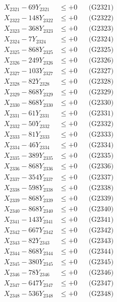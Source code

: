 \documentclass[a4paper,10pt]{article}
\begin{document}
{\begin{align}
\allowbreak
X_{2321} - 69Y_{2321} &\leq +0 && \text{(G2321)} \\
X_{2322} - 148Y_{2322} &\leq +0 && \text{(G2322)} \\
X_{2323} - 368Y_{2323} &\leq +0 && \text{(G2323)} \\
X_{2324} - 7Y_{2324} &\leq +0 && \text{(G2324)} \\
X_{2325} - 868Y_{2325} &\leq +0 && \text{(G2325)} \\
X_{2326} - 249Y_{2326} &\leq +0 && \text{(G2326)} \\
X_{2327} - 103Y_{2327} &\leq +0 && \text{(G2327)} \\
X_{2328} - 82Y_{2328} &\leq +0 && \text{(G2328)} \\
X_{2329} - 868Y_{2329} &\leq +0 && \text{(G2329)} \\
X_{2330} - 868Y_{2330} &\leq +0 && \text{(G2330)} \\
\allowbreak
X_{2331} - 61Y_{2331} &\leq +0 && \text{(G2331)} \\
X_{2332} - 50Y_{2332} &\leq +0 && \text{(G2332)} \\
X_{2333} - 81Y_{2333} &\leq +0 && \text{(G2333)} \\
X_{2334} - 46Y_{2334} &\leq +0 && \text{(G2334)} \\
X_{2335} - 389Y_{2335} &\leq +0 && \text{(G2335)} \\
X_{2336} - 868Y_{2336} &\leq +0 && \text{(G2336)} \\
X_{2337} - 354Y_{2337} &\leq +0 && \text{(G2337)} \\
X_{2338} - 598Y_{2338} &\leq +0 && \text{(G2338)} \\
X_{2339} - 868Y_{2339} &\leq +0 && \text{(G2339)} \\
X_{2340} - 868Y_{2340} &\leq +0 && \text{(G2340)} \\
\allowbreak
X_{2341} - 143Y_{2341} &\leq +0 && \text{(G2341)} \\
X_{2342} - 667Y_{2342} &\leq +0 && \text{(G2342)} \\
X_{2343} - 82Y_{2343} &\leq +0 && \text{(G2343)} \\
X_{2344} - 868Y_{2344} &\leq +0 && \text{(G2344)} \\
X_{2345} - 380Y_{2345} &\leq +0 && \text{(G2345)} \\
X_{2346} - 78Y_{2346} &\leq +0 && \text{(G2346)} \\
X_{2347} - 647Y_{2347} &\leq +0 && \text{(G2347)} \\
X_{2348} - 536Y_{2348} &\leq +0 && \text{(G2348)} \\

\end{align}}
\end{document}
